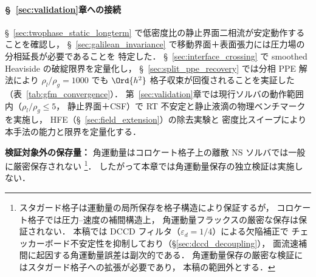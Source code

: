 \paragraph{§~\ref{sec:validation}章への接続}

§~\ref{sec:twophase_static_longterm} で低密度比の静止界面二相流が安定動作することを確認し，
§~\ref{sec:galilean_invariance} で移動界面＋表面張力には圧力場の分相延長が必要であることを
特定した．
§~\ref{sec:interface_crossing} で smoothed Heaviside の破綻限界を定量化し，
§~\ref{sec:split_ppe_recovery} では分相 PPE 解法により
$\rho_l/\rho_g = 1000$ でも $\Ord{h^2}$ 格子収束が回復されることを実証した
（表~\ref{tab:gfm_convergence}）．
第~\ref{sec:validation}章では現行ソルバの動作範囲内（$\rho_l/\rho_g \leq 5$，
静止界面＋CSF）で RT 不安定と静止液滴の物理ベンチマークを実施し，
HFE（§~\ref{sec:field_extension}）の除去実験と
密度比スイープにより本手法の能力と限界を定量化する．

\noindent\textbf{検証対象外の保存量：}
角運動量はコロケート格子上の離散 NS ソルバでは一般に厳密保存されない%
\footnote{スタガード格子は運動量の局所保存を格子構造により保証するが，
コロケート格子では圧力--速度の補間構造上，
角運動量フラックスの厳密な保存は保証されない．
本稿では DCCD フィルタ（$\varepsilon_d = 1/4$）による欠陥補正で
チェッカーボード不安定性を抑制しており（§\ref{sec:dccd_decoupling}），
面流速補間に起因する角運動量誤差は副次的である．
角運動量保存の厳密な検証にはスタガード格子への拡張が必要であり，
本稿の範囲外とする．}．
したがって本章では角運動量保存の独立検証は実施しない．
